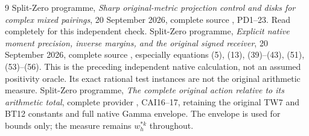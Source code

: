 \documentclass[11pt]{article}
\begin{document}
\begin{thebibliography}{9}
 Split-Zero programme,
\emph{Sharp original-metric projection control and disks for complex
mixed pairings}, 20 September 2026, complete source
,
PD1--23. Read completely for this independent check.
 Split-Zero programme,
\emph{Explicit native moment precision, inverse margins, and the
original signed receiver}, 20 September 2026, complete source
,
especially equations (5), (13), (39)--(43), (51), (53)--(56).
This is the preceding independent native calculation, not an
assumed positivity oracle. Its exact rational test instances are
not the original arithmetic measure.
 Split-Zero programme,
\emph{The complete original action relative to its arithmetic total},
complete provider , CAI16--17,
retaining the original TW7 and BT12 constants and full native
Gamma envelope. The envelope is used for bounds only; the
measure remains $w_h^{*k}$ throughout.
\end{thebibliography}

\endgroup

\end{document}
